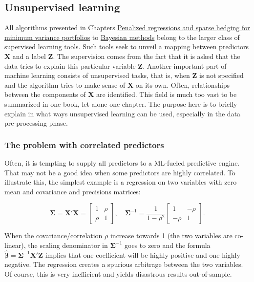 \subsection{Unsupervised learning}

All algorithms presented in Chapters \href{/chap-06-lasso}{Penalized regressions and sparse hedging for minimum variance portfolios} to \href{/chap-11-bayes}{Bayesian methods} belong to the larger class of supervised learning tools. Such tools seek to unveil a mapping between predictors $\textbf{X}$ and a label $\textbf{Z}$. The supervision comes from the fact that it is asked that the data tries to explain this particular variable $\textbf{Z}$. Another important part of machine learning consists of unsupervised tasks, that is, when $\textbf{Z}$ is not specified and the algorithm tries to make sense of $\textbf{X}$ on its own. Often, relationships between the components of $\textbf{X}$ are identified. This field is much too vast to be summarized in one book, let alone one chapter. The purpose here is to briefly explain in what ways unsupervised learning can be used, especially in the data pre-processing phase.

\subsubsection{The problem with correlated predictors}\label{corpred}

Often, it is tempting to supply all predictors to a ML-fueled predictive engine. That may not be a good idea when some predictors are highly correlated. To illustrate this, the simplest example is a regression on two variables with zero mean and covariance and precisions matrices:

\begin{equation}
\boldsymbol{\Sigma}=\textbf{X}'\textbf{X}=\begin{bmatrix} 1 & \rho \\ \rho & 1 \end{bmatrix},  \quad \boldsymbol{\Sigma}^{-1}=\frac{1}{1-\rho^2}\begin{bmatrix} 1 & -\rho \\ -\rho & 1 \end{bmatrix}.
\end{equation}

When the covariance/correlation $\rho$ increase towards 1 (the two variables are co-linear), the scaling denominator in $\boldsymbol{\Sigma}^{ -1}$ goes to zero and the formula $\hat{\boldsymbol{\beta}}=\boldsymbol{\Sigma}^{ -1}\textbf{X}'\textbf{Z}$ implies that one coefficient will be highly positive and one highly negative. The regression creates a spurious arbitrage between the two variables. Of course, this is very inefficient and yields disastrous results out-of-sample.

